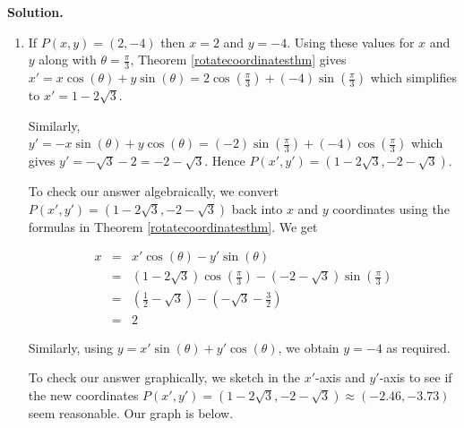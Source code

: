 \documentclass{ximera}
\begin{document}
{\begin{example}
{\bf Solution.}

\begin{enumerate}

 \item  If $P(x,y) = (2,-4)$ then $x=2$ and $y=-4$.  Using these values for $x$ and $y$ along with  $\theta = \frac{\pi}{3}$, Theorem \ref{rotatecoordinatesthm} gives
$x' = x \cos(\theta) + y \sin(\theta) = 2 \cos\left(\frac{\pi}{3}\right) + (-4)\sin\left(\frac{\pi}{3}\right)$ which simplifies to $x' = 1-2\sqrt{3}$.  

\smallskip

Similarly,  $y' = -x\sin(\theta) + y\cos(\theta) = (-2)\sin\left(\frac{\pi}{3}\right) + (-4)\cos\left(\frac{\pi}{3}\right)$ which gives $y' = -\sqrt{3}-2 = -2-\sqrt{3}$. Hence $P(x',y') = \left(1-2\sqrt{3}, -2-\sqrt{3}\right)$.  

\smallskip

To check our answer algebraically,  we convert $P(x',y') = \left(1-2\sqrt{3},-2-\sqrt{3}\right)$ back into $x$ and $y$ coordinates using the formulas in   Theorem \ref{rotatecoordinatesthm}.  We get

\[ \begin{array}{rcl}
x  & = &  x' \cos(\theta) - y' \sin(\theta) \\ [3pt]
   & = & (1-2\sqrt{3}) \cos\left(\frac{\pi}{3}\right) - (-2-\sqrt{3})\sin\left(\frac{\pi}{3}\right) \\ [3pt]
   & = & \left(\frac{1}{2} - \sqrt{3} \right) -\left(-\sqrt{3} - \frac{3}{2}\right)\\ [3pt]
   & = & 2 \end{array} \] 
   
Similarly, using  $y =  x'\sin(\theta) + y'\cos(\theta)$, we obtain $y = -4$ as required.  

\smallskip

To check our answer graphically, we sketch in the $x'$-axis and $y'$-axis to see if the new coordinates   $P(x',y') = \left(1-2\sqrt{3},-2-\sqrt{3}\right) \approx (-2.46,-3.73)$ seem reasonable.  Our graph is below.



\end{enumerate}
\end{example}}
\end{document}
